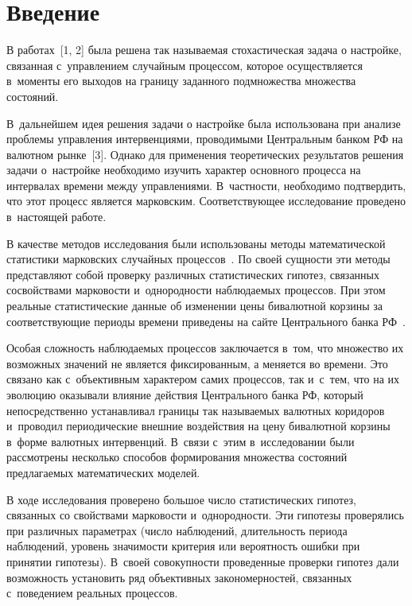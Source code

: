 \thispagestyle{headings}

\begin{multicols}{2}

\label{st\stat}
  
\section{Введение}

  В работах~[1, 2] была решена так называемая стохастическая задача о 
настройке, связанная с~управ\-ле\-ни\-ем случайным процессом, которое 
осуществляется в~моменты его выходов на границу заданного подмножества 
множества состояний. 

В~дальнейшем идея решения задачи о настройке была 
использована при анализе проблемы управления интервенциями, проводимыми 
Центральным банком РФ на валютном рынке~[3]. Однако для применения 
теоретических результатов решения задачи о~настройке необходимо изучить 
характер основного процесса на интервалах времени между управлениями. 
В~частности, необходимо подтвердить, что этот процесс является марковским. 
Со\-от\-вет\-ст\-ву\-ющее исследование проведено в~настоящей работе.
  
  В качестве методов исследования были использованы методы 
математической статистики марковских случайных процессов~\cite{4-shn, 5-shn}. 
По своей сущности эти методы представляют собой проверку различных 
статистических гипотез, связанных со\linebreak свойствами марковости и~однородности 
на\-блю\-да\-емых процессов. При этом реальные статистические данные об 
изменении цены бивалютной корзины за соответствующие периоды времени 
\mbox{приведены} на сайте Центрального банка РФ~\cite{6-shn}.
  
  Особая сложность наблюдаемых процессов заключается в~том, что 
множество их возможных значений не является фиксированным, а меняется во\linebreak 
времени. Это связано как с~объективным характером самих процессов, так 
и~с~тем, что на их эволю\-цию оказывали влияние действия Централь\-ного банка 
РФ, который непосредственно \mbox{устанавливал} границы так называемых 
валютных коридоров и~проводил периодические внешние воздействия на цену 
бивалютной корзины в~форме валютных интервенций. В~связи с~этим 
в~исследовании были рассмотрены несколько способов формирования 
множества состояний предлагаемых математических моделей.
  
  В ходе исследования проверено большое число статистических гипотез, 
связанных со свойствами марковости и~однородности. Эти гипотезы 
проверялись при различных параметрах (число наблюдений, длительность 
периода наблюдений, уровень значимости критерия или вероятность ошибки 
при принятии гипотезы). В~своей совокупности проведенные проверки гипотез 
дали возможность установить ряд объективных закономерностей, связанных 
с~поведением реальных процессов. 


\end{multicols}

